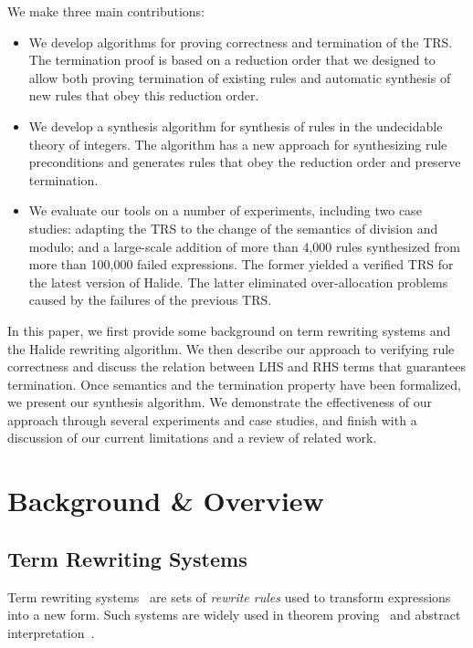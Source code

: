 \documentclass[acmsmall,review,anonymous]{acmart}\settopmatter{printfolios=true,printccs=false,printacmref=false}
\begin{document}
We make three main contributions:
\begin{itemize}
  \item We develop algorithms for proving correctness and termination of the TRS. The termination proof is based on a reduction order that we designed to allow both proving termination of existing rules and automatic synthesis of new rules that obey this reduction order. 
  \item We develop a synthesis algorithm for synthesis of rules in the undecidable theory of integers. 
  The algorithm has a new approach for synthesizing rule preconditions and generates rules that obey the reduction order and preserve termination.

  \item{We evaluate our tools on a number of experiments, including two case studies: adapting the TRS to the change of the semantics of division and modulo; and a large-scale addition of more than 4,000 rules synthesized from more than 100,000 failed expressions. The former yielded a verified TRS for the latest version of Halide.  The latter eliminated over-allocation problems caused by the failures of the previous TRS.}
\end{itemize}

In this paper, we first provide some background on term rewriting systems and the Halide rewriting algorithm. We then describe our approach to verifying rule correctness and discuss the relation between LHS and RHS terms that guarantees termination. Once semantics and the termination property have been formalized, we present our synthesis algorithm. We demonstrate the effectiveness of our approach through several experiments and case studies, and finish with a discussion of our current limitations and a review of related work.

\section{Background \& Overview}
\subsection{Term Rewriting Systems}
Term rewriting systems~\cite{gorn1967} are sets of \textit{rewrite rules} used to transform expressions into a new form.  Such systems are widely
used in theorem proving~\cite{baader1999term} and abstract interpretation~\cite{cousot1977abstract, cousot1979systematic}.
\end{document}
